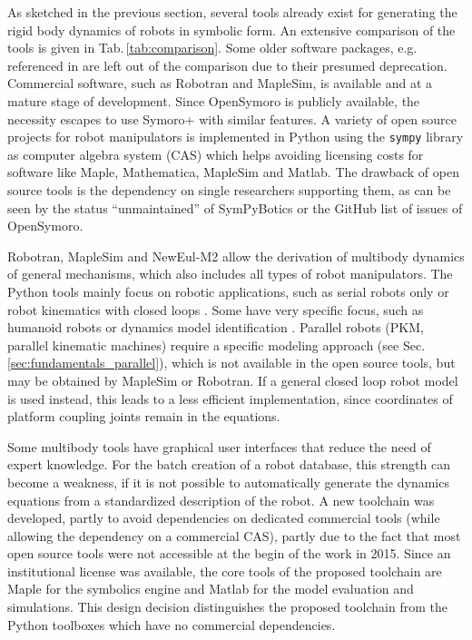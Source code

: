 \documentclass[runningheads]{llncs}
\begin{document}
As sketched in the previous section, several tools already exist for generating the rigid body dynamics of robots in symbolic form.
An extensive comparison of the tools is given in Tab.\,\ref{tab:comparison}.
Some older software packages, e.g. referenced in \cite{SousaCor2012} are left out of the comparison due to their presumed deprecation.
Commercial software, such as Robotran and MapleSim, is available and at a mature stage of development.
Since OpenSymoro is publicly available, the necessity escapes to use Symoro+ with similar features. %
A variety of open source projects for robot manipulators is implemented in Python using the \texttt{sympy} library as computer algebra system (CAS) which helps avoiding licensing costs for software like Maple, Mathematica, MapleSim and Matlab.
The drawback of open source tools is the dependency on single researchers supporting them, as can be seen by the status ``unmaintained'' of SymPyBotics or the GitHub list of issues of OpenSymoro.

Robotran, MapleSim and NewEul-M2 allow the derivation of multibody dynamics of general mechanisms, which also includes all types of robot manipulators.
The Python tools mainly focus on robotic applications, such as serial robots only \cite{SousaCor2012} or robot kinematics with closed loops \cite{KhalilVijKhoMuk2014,WangGonMunFis2019}.
Some have very specific focus, such as humanoid robots \cite{BethgeMalTsaCal2017} or dynamics model identification \cite{WangGonMunFis2019,BethgeMalTsaCal2017}.
Parallel robots (PKM, parallel kinematic machines) require a specific modeling approach (see Sec.\,\ref{sec:fundamentals_parallel}), which is not available in the open source tools, but may be obtained by MapleSim or Robotran.
If a general closed loop robot model is used instead, this leads to a less efficient implementation, since coordinates of platform coupling joints remain in the equations. %

Some multibody tools have graphical user interfaces that reduce the need of expert knowledge.
For the batch creation of a robot database, this strength can become a weakness, if it is not possible to automatically generate the dynamics equations from a standardized description of the robot.
A new toolchain was developed, partly to avoid dependencies on dedicated commercial tools (while allowing the dependency on a commercial CAS), partly due to the fact that most open source tools were not accessible at the begin of the work in 2015.
Since an institutional license was available, the core tools of the proposed toolchain are Maple for the symbolics engine and Matlab for the model evaluation and simulations.
This design decision distinguishes the proposed toolchain from the Python toolboxes which have no commercial dependencies. %
\end{document}
